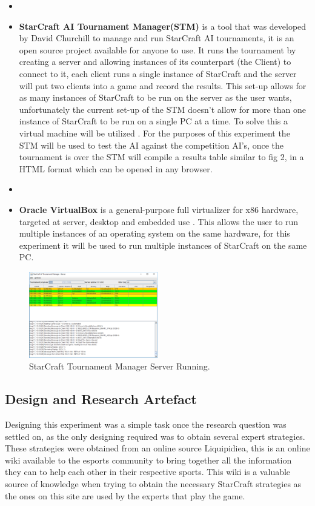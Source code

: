 \documentclass[journal]{IEEEtran}
\begin{document}
\begin{itemize}
	\item[]
	\item \textbf{StarCraft AI Tournament Manager(STM)} is a tool that was developed by David Churchill to manage and run StarCraft AI tournaments, it is an open source project available for anyone to use. It runs the tournament by creating a server and allowing instances of its counterpart (the Client) to connect to it, each client runs a single instance of StarCraft and the server will put two clients into a game and record the results. This set-up allows for as many instances of StarCraft to be run on the server as the user wants, unfortunately the current set-up of the STM doesn't allow for more than one instance of StarCraft to be run on a single PC at a time. To solve this a virtual machine will be utilized \cite{Tournament}. For the purposes of this experiment the STM will be used to test the AI against the competition AI's, once the tournament is over the STM will compile  a results table similar to fig 2, in a HTML format which can be opened in any browser.
	\item[]
	\item \textbf{Oracle VirtualBox} is a general-purpose full virtualizer for x86 hardware, targeted at server, desktop and embedded use \cite{Virtual}. This allows the user to run multiple instances of an operating system on the same hardware, for this experiment it will be used to run multiple instances of StarCraft on the same PC. 
\end{itemize}

\begin{figure}[H]
	\centering
	\includegraphics[width=0.5\textwidth]{TMPic}
	\caption{StarCraft Tournament Manager Server Running.}
	\label{Fig2}
\end{figure}

\subsection{Design and Research Artefact}
Designing this experiment was a simple task once the research question was settled on, as the only designing required was to obtain several expert strategies. These strategies were obtained from an online source Liquipidiea, this is an online wiki available to the esports community to bring together all the information they can to help each other in their respective sports. This wiki is a valuable source of knowledge when trying to obtain the necessary StarCraft strategies as the ones on this site are used by the experts that play the game. 
\end{document}
